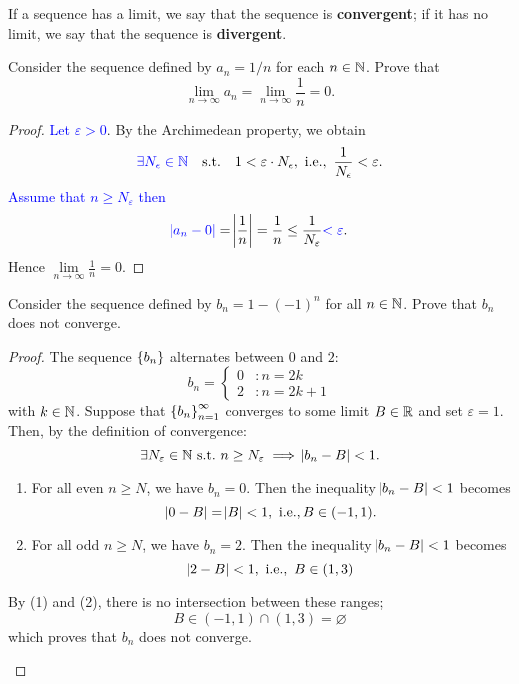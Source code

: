 \documentclass[11pt,openany]{article}
\begin{document}
\newpage
\begin{note}
	If a sequence has a limit, we say that the sequence is \textbf{convergent}; if it has no limit, we say that the sequence is \textbf{divergent}.
\end{note}
\vfill
\begin{example*}
	Consider the sequence defined by $a_n=1/n$ for each $n\in\mathbb{N}$. Prove that \[
	\lim\limits_{n\to\infty}a_n=\lim\limits_{n\to\infty}\frac{1}{n}=0.
	\]
	\begin{center}
		
	\end{center}
	\begin{proof}
		\textcolor{blue}{Let $\varepsilon>0$}. By the Archimedean property, we obtain \[
		\textcolor{blue}{\exists N_\epsilon\in\N}\quad \text{s.t.}\quad 1<\varepsilon\cdot N_\epsilon,\ \ie,\ \frac{1}{N_\epsilon}<\varepsilon.
		\] \textcolor{blue}{Assume that $n\geq N_\varepsilon$ then} \[
		\textcolor{blue}{\abs{a_n-0}}=\abs{\frac{1}{n}}=\frac{1}{n}\leq\frac{1}{N_\varepsilon}
		\textcolor{blue}{<\varepsilon}.
		\] Hence $\displaystyle\lim\limits_{n\to\infty}\frac{1}{n}=0$.
	\end{proof}
\end{example*}
\vfill
\begin{example*}
	Consider the sequence defined by $b_n=1-(-1)^n$ for all $n\in\mathbb{N}$. Prove that $b_n$ does not converge. 
	\begin{center}
		
	\end{center}
	\begin{proof}
		The sequence $\set{b_n}$ alternates between $0$ and $2$: \[
		b_n=\begin{cases}
			0 &:n=2k \\
			2 &:n=2k+1
		\end{cases}
		\] with $k\in\mathbb{N}$.
		Suppose that $\set{b_n}_{n=1}^\infty$ converges to some limit $B\in\mathbb{R}$ and set
		$\varepsilon=1$. Then, by the definition of convergence:\[
		\exists N_\varepsilon\in\mathbb{N}\ \text{s.t.}\ n\geq N_\varepsilon\implies\abs{b_n-B}<1.
		\] \begin{enumerate}
			\item  For all even $n\geq N$, we have $b_n=0$.  Then the inequality $\abs{b_n-B}<1$ becomes \begin{equation}
				\abs{0-B}=\abs{B}<1,\ \textnormal{i.e.}, B\in(-1,1).
			\end{equation}
			\item For all odd $n\geq N$, we have $b_n=2$.  Then the inequality $\abs{b_n-B}<1$ becomes \begin{equation}
				\abs{2-B}<1,\ \ie,\ B\in\intoo{1,3}
			\end{equation}
		\end{enumerate}
		By (1) and (2), there is no intersection between these ranges; \[
		B\in(-1,1)\cap(1,3)=\varnothing
		\] which proves that $b_n$ does not converge.
		\begin{center}
			
		\end{center}
	\end{proof}
\end{example*}
\end{document}
